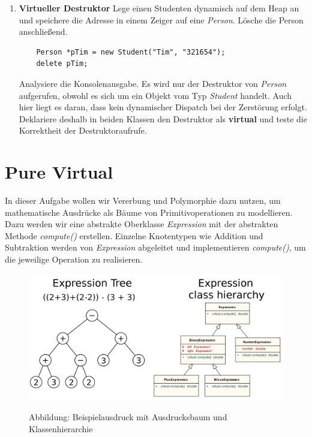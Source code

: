 \begin{enumerate}
\item \textbf{Virtueller Destruktor}
Lege einen Studenten dynamisch auf dem Heap an und speichere die Adresse  in einem Zeiger auf eine \emph{Person}.
Lösche die Person anschließend.
\begin{lstlisting}
	Person *pTim = new Student("Tim", "321654");
	delete pTim;
\end{lstlisting}

Analysiere die Konsolenausgabe.
Es wird nur der Destruktor von \emph{Person} aufgerufen, obwohl es sich um ein Objekt vom Typ \emph{Student} handelt.
Auch hier liegt es daran, dass kein dynamischer Dispatch bei der Zerstörung erfolgt.
Deklariere deshalb in beiden Klassen den Destruktor als \textbf{virtual} und teste die Korrektheit der Destruktoraufrufe.

\end{enumerate}


\section{Pure Virtual}
In dieser Aufgabe wollen wir Vererbung und Polymorphie dazu nutzen, um mathematische Ausdrücke als Bäume von Primitivoperationen zu modellieren.
Dazu werden wir eine abstrakte Oberklasse \emph{Expression} mit der abstrakten Methode \emph{compute()} erstellen.
Einzelne Knotentypen wie Addition und Subtraktion werden von \emph{Expression} abgeleitet und implementieren \emph{compute()}, um die jeweilige Operation zu realisieren.
\begin{figure}[h]
\begin{center}
	\includegraphics[width=.75\textwidth]{ExpressionTree.png}\\
	\caption{Abbildung: Beispielausdruck mit Ausdrucksbaum und Klassenhierarchie}
\end{center}
\end{figure}


